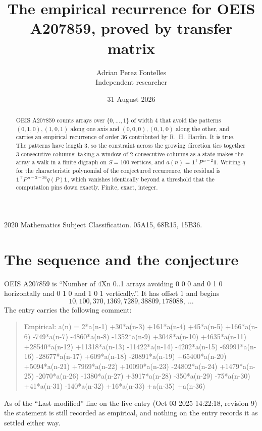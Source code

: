 \documentclass[11pt,a4paper]{article}
\title{The empirical recurrence for OEIS A207859, proved by transfer matrix}
\author{Adrian Perez Fontelles\\ \small Independent researcher}
\date{31 August 2026}
\theoremstyle{plain}
\theoremstyle{definition}
\begin{document}
\maketitle

\begin{abstract}
OEIS A207859 counts arrays over $\{0,\dots,1\}$ of width $4$ that avoid the patterns
$(0,1,0), (1,0,1)$ along one axis and $(0,0,0), (0,1,0)$ along the other, and carries an empirical recurrence of
order $36$ contributed by R.~H.~Hardin. It is true. The patterns have length $3$, so
the constraint across the growing direction ties together $3$ consecutive columns: taking a
window of $2$ consecutive columns as a state makes the array a walk in a finite digraph
on $S=100$ vertices, and $a(n)=\mathbf{1}^{\!\top}P^{\,n-2}\mathbf{1}$. Writing $q$
for the characteristic polynomial of the conjectured recurrence, the residual is
$\mathbf{1}^{\!\top}P^{\,n-2-36}q(P)\mathbf{1}$, which vanishes identically
beyond a threshold that the computation pins down exactly. Finite, exact, integer.
\end{abstract}

\noindent\small 2020 Mathematics Subject Classification. 05A15, 68R15, 15B36.\normalsize

\section{The sequence and the conjecture}

OEIS A207859 is ``Number of 4Xn 0..1 arrays avoiding 0 0 0 and 0 1 0 horizontally and 0 1 0 and 1 0 1 vertically.''. It has offset
$1$ and begins
\[
10, 100, 370, 1369, 7289, 38809, 178088,\ \dots
\]
The entry carries the following comment:
\begin{quote}\small
Empirical: a(n) = 2*a(n-1) +30*a(n-3) +161*a(n-4) +45*a(n-5) +166*a(n-6) -749*a(n-7) -4860*a(n-8) -1352*a(n-9) +3048*a(n-10) +4635*a(n-11) +28540*a(n-12) +11318*a(n-13) -11422*a(n-14) -4202*a(n-15) -69991*a(n-16) -28677*a(n-17) +609*a(n-18) -20891*a(n-19) +65400*a(n-20) +5094*a(n-21) +7969*a(n-22) +10090*a(n-23) -24802*a(n-24) +1479*a(n-25) -2070*a(n-26) -1380*a(n-27) +3917*a(n-28) -350*a(n-29) -75*a(n-30) +41*a(n-31) -140*a(n-32) +16*a(n-33) +a(n-35) +a(n-36)
\end{quote}
As of the ``Last modified'' line on the live entry (Oct 03 2025 14:22:18, revision
9) the statement is still recorded as empirical, and nothing on the entry
records it as settled either way.
\end{document}

